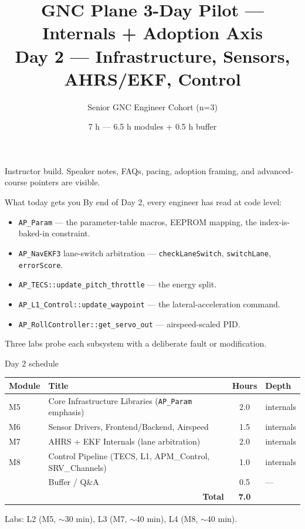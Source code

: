 \documentclass[aspectratio=169,11pt]{beamer}
\title{GNC Plane 3-Day Pilot --- Internals + Adoption Axis\\\large Day 2 --- Infrastructure, Sensors, AHRS/EKF, Control}
\subtitle{Senior GNC Engineer Cohort (n=3)}
\date{7 h --- 6.5 h modules + 0.5 h buffer}
\author{}
\institute{\copyrightline}
\begin{document}
\begin{frame}
  \titlepage
  \ifinstructor
    \footnotesize Instructor build. Speaker notes, FAQs, pacing, adoption framing, and advanced-course pointers are visible.
  \fi
\end{frame}

\begin{frame}[allowframebreaks]{What today gets you}
  By end of Day 2, every engineer has read at code level:
  \begin{itemize}
    \item \texttt{AP\_Param} --- the parameter-table macros, EEPROM mapping, the index-is-baked-in constraint.
    \item \texttt{AP\_NavEKF3} lane-switch arbitration --- \texttt{checkLaneSwitch}, \texttt{switchLane}, \texttt{errorScore}.
    \item \texttt{AP\_TECS::update\_pitch\_throttle} --- the energy split.
    \item \texttt{AP\_L1\_Control::update\_waypoint} --- the lateral-acceleration command.
    \item \texttt{AP\_RollController::get\_servo\_out} --- airspeed-scaled PID.
  \end{itemize}
  \vfill
  Three labs probe each subsystem with a deliberate fault or modification.
\end{frame}

\begin{frame}{Day 2 schedule}
  \begin{center}\small
  \begin{tabular}{|l|l|c|l|}\hline
  Module & Title & Hours & Depth \\ \hline
  M5 & Core Infrastructure Libraries (\texttt{AP\_Param} emphasis) & 2.0 & internals \\ \hline
  M6 & Sensor Drivers, Frontend/Backend, Airspeed & 1.5 & internals \\ \hline
  M7 & AHRS + EKF Internals (lane arbitration) & 2.0 & internals \\ \hline
  M8 & Control Pipeline (TECS, L1, APM\_Control, SRV\_Channels) & 1.0 & internals \\ \hline
  & Buffer / Q\&A & 0.5 & --- \\ \hline
  \multicolumn{2}{|r|}{\textbf{Total}} & \textbf{7.0} & \\ \hline
  \end{tabular}
  \end{center}
  \vfill
  Labs: L2 (M5, $\sim$30 min), L3 (M7, $\sim$40 min), L4 (M8, $\sim$40 min).
\end{frame}
\end{document}
